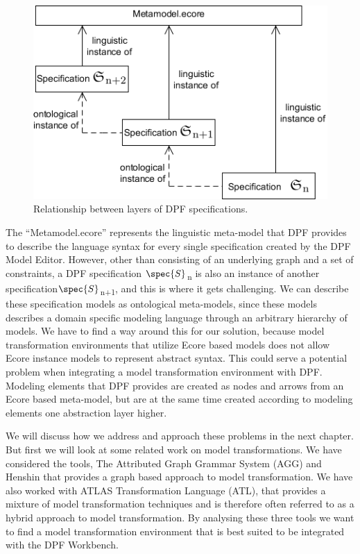 \begin{figure}[H]
	\centering
	\includegraphics[scale=0.7]{./Figures/metamodelSpecification_1.png}
	\caption[Specification relationship with core meta-model]
	{Relationship between layers of DPF specifications.}
	\label{fig:core_metamodel}
\end{figure}

The ``Metamodel.ecore'' represents the linguistic meta-model that DPF provides
to describe the language syntax for every single specification created by the DPF
Model Editor.
However, other than consisting of an underlying graph and a set of constraints,
a DPF specification $\spec{S}$\textsubscript{n} is also an instance of another
specification$\spec{S}$\textsubscript{n+1}, and this is where it gets
challenging. We can describe these specification models as
ontological meta-models, since these models describes a domain specific modeling
language through an arbitrary hierarchy of models. We have to find
a way around this for our solution, because model transformation environments
that utilize Ecore based models does not allow Ecore instance models to represent
abstract syntax. This could serve a potential problem when integrating a model
transformation environment with DPF. Modeling elements that DPF provides are
created as nodes and arrows from an Ecore based meta-model, but are at the same
time created according to modeling elements one abstraction layer higher.

We will discuss how we address and approach these problems in the next
chapter. But first we will look at some related work on model transformations.
We have considered the tools, The Attributed Graph Grammar
System\cite{Taentzer2004} (AGG) and Henshin\cite{Henshin_2010} that provides a
graph based approach to model transformation. We have also worked with ATLAS
Transformation Language\cite{ATL_USERMAN} (ATL), that provides a mixture of
model transformation techniques and is therefore often referred to as a hybrid
approach to model transformation. By analysing these three tools we want to
find a model transformation environment that is best suited to be integrated
with the DPF Workbench.

